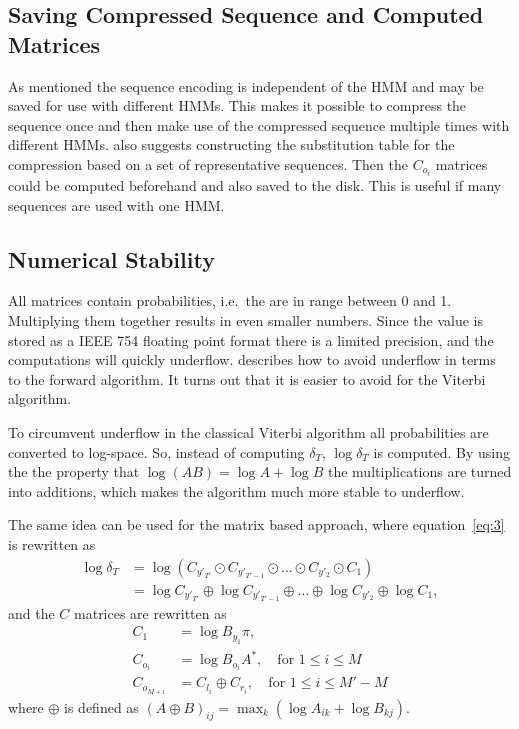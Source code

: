 \subsection{Saving Compressed Sequence and Computed Matrices}
\label{sec:saving-compr-sequ}

As mentioned the sequence encoding is independent of the HMM and may be saved
for use with different HMMs. This makes it possible to compress the sequence
once and then make use of the compressed sequence multiple times with different
HMMs. \citet{lifshits2009speeding} also suggests constructing the substitution
table for the compression based on a set of representative sequences. Then the
$C_{o_i}$ matrices could be computed beforehand and also saved to the
disk. This is useful if many sequences are used with one HMM.\

\subsection{Numerical Stability}

All matrices contain probabilities, i.e.\ the are in range between 0 and
1. Multiplying them together results in even smaller numbers. Since the value
is stored as a IEEE 754 floating point format there is a limited precision,
and the computations will quickly underflow. \citet{sand2013ziphmmlib}
describes how to avoid underflow in terms to the forward algorithm. It turns
out that it is easier to avoid for the Viterbi algorithm.

To circumvent underflow in the classical Viterbi algorithm all probabilities
are converted to log-space. So, instead of computing $\delta_T$,
$\log \delta_T$ is computed. By using the the property that
$\log(AB) = \log A + \log B$ the multiplications are turned into additions,
which makes the algorithm much more stable to underflow.

The same idea can be used for the matrix based approach, where
equation~\eqref{eq:3} is rewritten as
\begin{align*}
  \log \delta_T &= \log \left(C_{y'_{T'}} \odot C_{y'_{T'-1}} \odot \dots \odot
                  C_{y'_2} \odot C_1 \right) \\
                &= \log C_{y'_{T'}} \oplus \log C_{y'_{T'-1}} \oplus \dots \oplus
                  \log C_{y'_2} \oplus \log C_1,
\end{align*}
and the $C$ matrices are rewritten as
\begin{align*}
  C_1 &= \log B_{y_1} \pi, \\
  C_{o_i} &= \log B_{o_i} A^*, \quad \text{for }1 \le i \le M\\
  C_{o_{M + i}} &= C_{l_i} \oplus C_{r_i} , \quad \text{for }1 \le i \le M' - M
\end{align*}
where $\oplus$ is defined as
${ \left( A \oplus B \right)}_{ij} = \max_k \left( \log A_{ik} + \log B_{kj}
\right)$.


